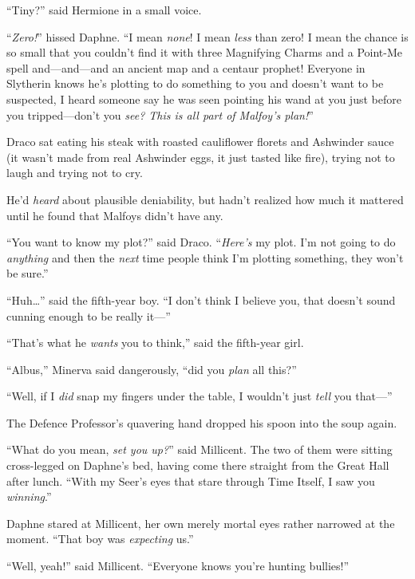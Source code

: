 “Tiny?” said Hermione in a small voice.

“\emph{Zero!}” hissed Daphne. “I mean \emph{none}! I mean \emph{less} than zero! I mean the chance is so small that you couldn’t find it with three Magnifying Charms and a Point-Me spell and—and—and an ancient map and a centaur prophet! Everyone in Slytherin knows he’s plotting to do something to you and doesn’t want to be suspected, I heard someone say he was seen pointing his wand at you just before you tripped—don’t you \emph{see? This is all part of Malfoy’s plan!}”

\later

Draco sat eating his steak with roasted cauliflower florets and Ashwinder sauce (it wasn’t made from real Ashwinder eggs, it just tasted like fire), trying not to laugh and trying not to cry.

He’d \emph{heard} about plausible deniability, but hadn’t realized how much it mattered until he found that Malfoys didn’t have any.

“You want to know my plot?” said Draco. “\emph{Here’s} my plot. I’m not going to do \emph{anything} and then the \emph{next} time people think I’m plotting something, they won’t be sure.”

“Huh…” said the fifth-year boy. “I don’t think I believe you, that doesn’t sound cunning enough to be really it—”

“That’s what he \emph{wants} you to think,” said the fifth-year girl.

\later

“Albus,” Minerva said dangerously, “did you \emph{plan} all this?”

\later

“Well, if I \emph{did} snap my fingers under the table, I wouldn’t just \emph{tell} you that—”

\later

The Defence Professor’s quavering hand dropped his spoon into the soup again.

\later

“What do you mean, \emph{set you up?}” said Millicent. The two of them were sitting cross-legged on Daphne’s bed, having come there straight from the Great Hall after lunch. “With my Seer’s eyes that stare through Time Itself, I saw you \emph{winning}.”

Daphne stared at Millicent, her own merely mortal eyes rather narrowed at the moment. “That boy was \emph{expecting} us.”

“Well, yeah!” said Millicent. “Everyone knows you’re hunting bullies!”

